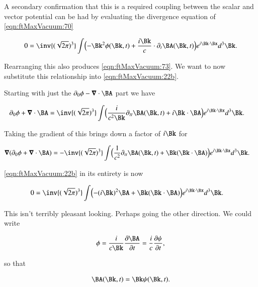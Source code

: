 A secondary confirmation that this is a required coupling between the scalar and vector potential can be had by evaluating the divergence equation of \autoref{eqn:ftMaxVacuum:70}

\begin{align}\label{eqn:ftMaxVacuum:72b}
0 = 
\inv{(\sqrt{2 \pi})^3} \int 
\Bigl(
- \Bk^2 \phi(\Bk, t) + \frac{i\Bk}{c} \cdot \partial_t \BA(\Bk, t)
\Bigr)
e^{i \Bk \cdot \Bx } d^3 \Bk.
\end{align}

Rearranging this also produces \autoref{eqn:ftMaxVacuum:73}.  We want to now substitute this relationship into \autoref{eqn:ftMaxVacuum:22b}.

Starting with just the $\partial_0 \phi - \spacegrad \cdot \BA$ part we have

\begin{align}\label{eqn:ftMaxVacuum:74}
\partial_0 \phi + \spacegrad \cdot \BA
&=
\inv{(\sqrt{2 \pi})^3} \int 
\Bigl(
\frac{i}{c^2 \Bk} \partial_{tt} \BA(\Bk, t) + i \Bk \cdot \BA
\Bigr)
e^{i \Bk \cdot \Bx } d^3 \Bk.
\end{align}

Taking the gradient of this brings down a factor of $i\Bk$ for

\begin{align}\label{eqn:ftMaxVacuum:74b}
\spacegrad (\partial_0 \phi + \spacegrad \cdot \BA)
&=
-\inv{(\sqrt{2 \pi})^3} \int 
\Bigl(
\frac{1}{c^2} \partial_{tt} \BA(\Bk, t) + \Bk (\Bk \cdot \BA)
\Bigr)
e^{i \Bk \cdot \Bx } d^3 \Bk.
\end{align}

\autoref{eqn:ftMaxVacuum:22b} in its entirety is now

\begin{align}\label{eqn:ftMaxVacuum:75}
0 &=
\inv{(\sqrt{2 \pi})^3} \int 
\Bigl(
- (i\Bk)^2 \BA
+ \Bk (\Bk \cdot \BA)
\Bigr)
e^{i \Bk \cdot \Bx } d^3 \Bk.
\end{align}

This isn't terribly pleasant looking.  Perhaps going the other direction.  We could write

\begin{align}\label{eqn:ftMaxVacuum:76}
\phi = \frac{i}{c \Bk} \PD{t}{\BA} = \frac{i}{c} \PD{t}{\psi},
\end{align}

so that

\begin{align}\label{eqn:ftMaxVacuum:77}
\BA(\Bk, t) = \Bk \psi(\Bk, t).
\end{align}

